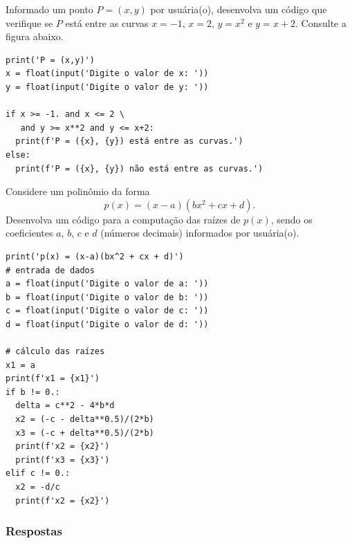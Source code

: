 \begin{exer}\label{cap_progest_sec_ramifica:exer:entre_curvas}
  Informado um ponto $P = (x, y)$ por usuária(o), desenvolva um código que verifique se $P$ está entre as curvas $x = -1$, $x = 2$, $y = x^2$ e $y = x+2$. Consulte a figura abaixo.


\end{exer}
\begin{resp}

\begin{lstlisting}
print('P = (x,y)')
x = float(input('Digite o valor de x: '))
y = float(input('Digite o valor de y: '))

if x >= -1. and x <= 2 \
   and y >= x**2 and y <= x+2:
  print(f'P = ({x}, {y}) está entre as curvas.')
else:
  print(f'P = ({x}, {y}) não está entre as curvas.')
\end{lstlisting}

\end{resp}

\begin{exer}
  Considere um polinômio da forma
  \begin{equation}
    p(x) = (x-a)(bx^2 + cx + d).
  \end{equation}
  Desenvolva um código para a computação das raízes de $p(x)$, sendo os coeficientes $a$, $b$, $c$ e $d$ (números decimais) informados por usuária(o).
\end{exer}
\begin{resp}

\begin{lstlisting}
print('p(x) = (x-a)(bx^2 + cx + d)')
# entrada de dados
a = float(input('Digite o valor de a: '))
b = float(input('Digite o valor de b: '))
c = float(input('Digite o valor de c: '))
d = float(input('Digite o valor de d: '))

# cálculo das raízes
x1 = a
print(f'x1 = {x1}')
if b != 0.:
  delta = c**2 - 4*b*d
  x2 = (-c - delta**0.5)/(2*b)
  x3 = (-c + delta**0.5)/(2*b)
  print(f'x2 = {x2}')
  print(f'x3 = {x3}')
elif c != 0.:
  x2 = -d/c
  print(f'x2 = {x2}')
\end{lstlisting}

\end{resp}

\ifisbook
\newpage
\subsubsection{Respostas}
\shipoutAnswer
\fi


